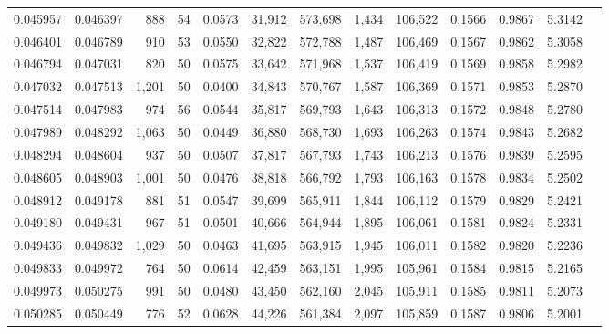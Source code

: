 \begin{tabular}{rrrrrrrrrrrrr}
0.045957 & 0.046397 &   888 &  54 &                                     0.0573 &  31,912 & 573,698 &   1,434 & 106,522 & 0.1566 & 0.9867 & 5.3142 \\
0.046401 & 0.046789 &   910 &  53 &                                     0.0550 &  32,822 & 572,788 &   1,487 & 106,469 & 0.1567 & 0.9862 & 5.3058 \\
0.046794 & 0.047031 &   820 &  50 &                                     0.0575 &  33,642 & 571,968 &   1,537 & 106,419 & 0.1569 & 0.9858 & 5.2982 \\
0.047032 & 0.047513 & 1,201 &  50 &                                     0.0400 &  34,843 & 570,767 &   1,587 & 106,369 & 0.1571 & 0.9853 & 5.2870 \\
0.047514 & 0.047983 &   974 &  56 &                                     0.0544 &  35,817 & 569,793 &   1,643 & 106,313 & 0.1572 & 0.9848 & 5.2780 \\
0.047989 & 0.048292 & 1,063 &  50 &                                     0.0449 &  36,880 & 568,730 &   1,693 & 106,263 & 0.1574 & 0.9843 & 5.2682 \\
0.048294 & 0.048604 &   937 &  50 &                                     0.0507 &  37,817 & 567,793 &   1,743 & 106,213 & 0.1576 & 0.9839 & 5.2595 \\
0.048605 & 0.048903 & 1,001 &  50 &                                     0.0476 &  38,818 & 566,792 &   1,793 & 106,163 & 0.1578 & 0.9834 & 5.2502 \\
0.048912 & 0.049178 &   881 &  51 &                                     0.0547 &  39,699 & 565,911 &   1,844 & 106,112 & 0.1579 & 0.9829 & 5.2421 \\
0.049180 & 0.049431 &   967 &  51 &                                     0.0501 &  40,666 & 564,944 &   1,895 & 106,061 & 0.1581 & 0.9824 & 5.2331 \\
0.049436 & 0.049832 & 1,029 &  50 &                                     0.0463 &  41,695 & 563,915 &   1,945 & 106,011 & 0.1582 & 0.9820 & 5.2236 \\
0.049833 & 0.049972 &   764 &  50 &                                     0.0614 &  42,459 & 563,151 &   1,995 & 105,961 & 0.1584 & 0.9815 & 5.2165 \\
0.049973 & 0.050275 &   991 &  50 &                                     0.0480 &  43,450 & 562,160 &   2,045 & 105,911 & 0.1585 & 0.9811 & 5.2073 \\
0.050285 & 0.050449 &   776 &  52 &                                     0.0628 &  44,226 & 561,384 &   2,097 & 105,859 & 0.1587 & 0.9806 & 5.2001 \\

\end{tabular}
